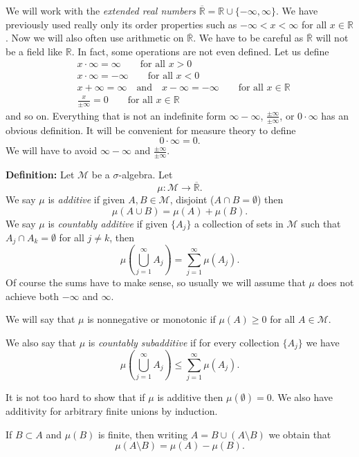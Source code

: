 \documentclass[12pt]{book}
\newcommand{\R}{{\mathbb{R}}}
\newcommand{\sM}{{\mathcal{M}}}
\theoremstyle{plain}
\theoremstyle{remark}
\theoremstyle{definition}
\theoremstyle{exercise}
\theoremstyle{example}
\begin{document}
We will work with the \emph{extended real numbers}
$\overline{\R} = \R \cup \{ -\infty, \infty \}$.  We have previously used
really only its order properties such as $-\infty < x < \infty$ for
all $x \in \R$.  Now we will also often use arithmetic on 
$\overline{\R}$.  We have to be careful as
$\overline{\R}$ will not be a field like $\R$.  In fact, some operations are
not even defined.  Let us define
\begin{align*}
& x \cdot \infty = \infty \qquad \text{for all $x > 0$} \\
& x \cdot \infty = -\infty \qquad \text{for all $x < 0$} \\
& x + \infty = \infty \quad \text{and} \quad x - \infty = -\infty \qquad
\text{for all $x \in \R$} \\
&
\frac{x}{\pm\infty} = 0
\qquad \text{for all $x \in \R$}
\end{align*}
and so on.  Everything that is not an indefinite form
$\infty - \infty$, $\frac{\pm \infty}{\pm \infty}$, or $0 \cdot \infty$
has an obvious definition.  It will be convenient for measure theory to define
$$
0 \cdot \infty = 0 .
$$
We will have to avoid $\infty - \infty$ and
$\frac{\pm \infty}{\pm \infty}$.

\medskip

\textbf{Definition:}
Let $\sM$ be a $\sigma$-algebra.  Let
$$
\mu \colon \sM \to \overline{\R} .
$$
We say $\mu$ is \emph{additive} if given $A, B \in \sM$,
disjoint ($A \cap B = \emptyset$) then
$$
\mu ( A \cup B) = \mu (A) + \mu(B) .
$$
We say $\mu$ is \emph{countably additive} if given $\{ A_j \}$ a collection
of sets in $\sM$ such that $A_j \cap A_k = \emptyset$ for all $j\not=k$, then
$$
\mu \left( \bigcup_{j=1}^\infty A_j \right) =
\sum_{j=1}^\infty \mu (A_j) .
$$
Of course the sums have to make sense, so usually we will assume that $\mu$
does not achieve both $-\infty$ and $\infty$.

We will say that $\mu$ is nonnegative or monotonic if $\mu(A) \geq 0$ for all $A \in \sM$.

We also say that
$\mu$ is \emph{countably subadditive} if for every collection
$\{ A_j \}$ we have
$$
\mu \left( \bigcup_{j=1}^\infty A_j \right) \leq
\sum_{j=1}^\infty \mu (A_j) .
$$

\medskip

It is not too hard to show that if $\mu$ is additive then $\mu(\emptyset) =
0$.  We also have additivity for arbitrary finite unions by induction.

If $B \subset A$ and $\mu(B)$ is finite, then
writing $A = B \cup (A\setminus B)$ we obtain that 
$$
\mu(A\setminus B) = \mu(A) - \mu(B) .
$$
\end{document}
